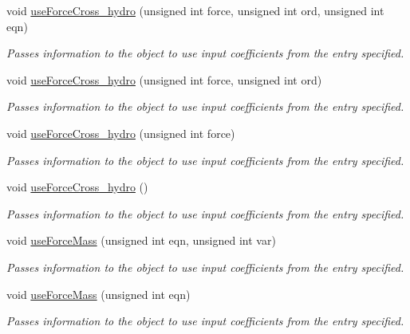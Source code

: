 \begin{DoxyCompactItemize}
void \hyperlink{classosea_1_1ofreq_1_1_motion_model_a6f745d15ee67cafd2943e016166a7f51}{use\-Force\-Cross\-\_\-hydro} (unsigned int force, unsigned int ord, unsigned int eqn)
\begin{DoxyCompactList}\small\item\em Passes information to the object to use input coefficients from the entry specified. \end{DoxyCompactList}\item 
void \hyperlink{classosea_1_1ofreq_1_1_motion_model_ab85d9879e0af7e035aa90d264a28095e}{use\-Force\-Cross\-\_\-hydro} (unsigned int force, unsigned int ord)
\begin{DoxyCompactList}\small\item\em Passes information to the object to use input coefficients from the entry specified. \end{DoxyCompactList}\item 
void \hyperlink{classosea_1_1ofreq_1_1_motion_model_a642fb3df74231a5ad0c9f068e23f73ca}{use\-Force\-Cross\-\_\-hydro} (unsigned int force)
\begin{DoxyCompactList}\small\item\em Passes information to the object to use input coefficients from the entry specified. \end{DoxyCompactList}\item 
void \hyperlink{classosea_1_1ofreq_1_1_motion_model_a9eec7ca7d497eaff8ae8c4dff24ec5da}{use\-Force\-Cross\-\_\-hydro} ()
\begin{DoxyCompactList}\small\item\em Passes information to the object to use input coefficients from the entry specified. \end{DoxyCompactList}\item 
void \hyperlink{classosea_1_1ofreq_1_1_motion_model_aecaf9f0261355cff2acf602acd728644}{use\-Force\-Mass} (unsigned int eqn, unsigned int var)
\begin{DoxyCompactList}\small\item\em Passes information to the object to use input coefficients from the entry specified. \end{DoxyCompactList}\item 
void \hyperlink{classosea_1_1ofreq_1_1_motion_model_a5c3368c9b82042765c2b542cfa78c200}{use\-Force\-Mass} (unsigned int eqn)
\begin{DoxyCompactList}\small\item\em Passes information to the object to use input coefficients from the entry specified. \end{DoxyCompactList}\item 

\end{DoxyCompactItemize}
